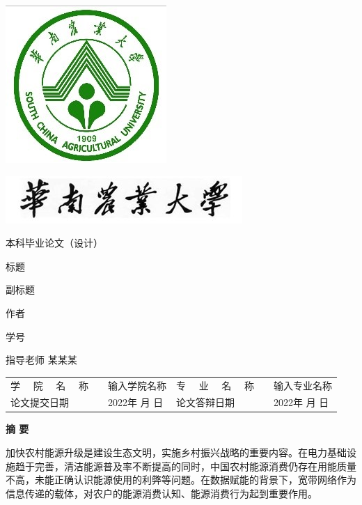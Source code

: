 \documentclass[a4paper, 12pt, oneside]{article} %
\begin{document}
	\thispagestyle{empty}
	\vspace{2em}
	\includegraphics{校徽.jpg}
	\vspace{2em}
	\begin{center}
		\includegraphics{校名.jpg}
	\end{center}
	\vspace{5em}
	\centerline{ \songti 本科毕业论文（设计）}
	\vspace{5em}
	\begin{center}
		{ \heiti 标题}
		
		\vspace{3em}
		{ \songti 副标题}
	\end{center}
	\vspace{5em}
	\centerline{作者}
	\centerline{学号}
	\vspace{4em}
	\centerline{指导老师 \quad 某某某}
	\vspace{5em}
	\begin{center}	
		\begin{tabular}{llllll}
			学 \ \ 院 \ \ 名 \ \ 称   &  & 输入学院名称     & 专 \ \ 业 \ \ 名 \ \ 称   &  & 输入专业名称 \\ \cline{3-3} \cline{6-6} 
			论文提交日期 &  & 2022年 月  日 & 论文答辩日期 &  & 2022年 月  日    \\ \cline{3-3} \cline{6-6} 
		\end{tabular}
	\end{center}

	\newpage %
	\setcounter{page}{1}
	\centerline{\textbf{摘 \quad \quad 要}}
		加快农村能源升级是建设生态文明，实施乡村振兴战略的重要内容。在电力基础设施趋于完善，清洁能源普及率不断提高的同时，中国农村能源消费仍存在用能质量不高，未能正确认识能源使用的利弊等问题。在数据赋能的背景下，宽带网络作为信息传递的载体，对农户的能源消费认知、能源消费行为起到重要作用。
		
\end{document}
